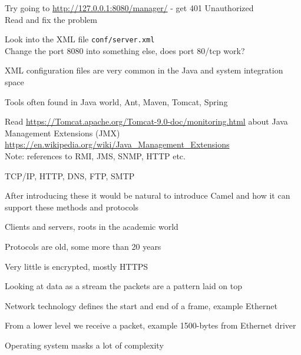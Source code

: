 \documentclass[Screen16to9,17pt]{foils}
\begin{document}

 \begin{list2}
 \item Try going to \url{http://127.0.0.1:8080/manager/} - get 401 Unauthorized\\
 Read and fix the problem
 \item Look into the XML file \verb+conf/server.xml+\\
 Change the port 8080 into something else, does port 80/tcp work?
 \item XML configuration files are very common in the Java and system integration space
 \item Tools often found in Java world, Ant, Maven, Tomcat, Spring
 \item Read \url{https://Tomcat.apache.org/Tomcat-9.0-doc/monitoring.html} about Java Management Extensions (JMX) \url{https://en.wikipedia.org/wiki/Java_Management_Extensions}\\
 Note: references to RMI, JMS, SNMP, HTTP etc.
 \end{list2}



 TCP/IP, HTTP, DNS, FTP, SMTP

After introducing these it would be natural to introduce Camel and how it can support these methods and protocols




\begin{list1}
\item Clients and servers, roots in the academic world
\item Protocols are old, some more than 20 years
\item Very little is encrypted, mostly HTTPS
\end{list1}





\begin{list1}
\item Looking at data as a stream the packets are a pattern laid on top
\item Network technology defines the start and end of a frame, example Ethernet
\item From a lower level we receive a packet, example 1500-bytes from Ethernet driver
\item Operating system masks a lot of complexity
\end{list1}
\end{document}
